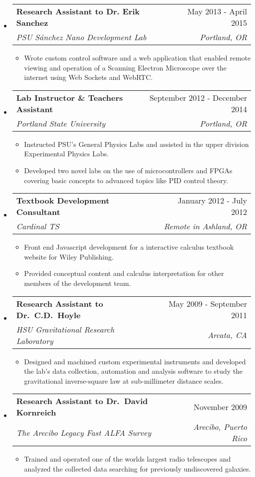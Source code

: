 \documentclass[letterpaper,11pt]{article}
\makeatletter
\newcommand{\resitem}[1]{\item #1 \vspace{-2pt}}
\newcommand{\ressubheading}[4]{
\begin{tabular*}{7.0in}{l@{\extracolsep{\fill}}r}
		\textbf{#1} & #2 \\
		\textit{#3} & \textit{#4} \\
\end{tabular*}\vspace{-6pt}}
\makeatother
\begin{document}
\begin{itemize}
\item
\ressubheading
{Research Assistant to Dr. Erik Sanchez}
{May 2013 - April 2015}
{PSU S\'anchez Nano Development Lab}
{Portland, OR}
\begin{itemize}
    \resitem
    {Wrote custom control software and a web application that enabled remote viewing and operation of a Scanning Electron Microscope over the internet using Web Sockets and WebRTC.}
\end{itemize}

\item
\ressubheading
{Lab Instructor \& Teachers Assistant}
{September 2012 - December 2014}
{Portland State University}
{Portland, OR}
\begin{itemize}
	\resitem
    {Instructed PSU's General Physics Labs and assisted in the upper division Experimental Physics Labs.}
	\resitem
    {Developed two novel labs on the use of microcontrollers and FPGAs covering basic concepts to advanced topics like PID control theory.}
\end{itemize}

\item
\ressubheading{Textbook Development Consultant}{January 2012 - July 2012}{Cardinal TS}{Remote in Ashland, OR}
\begin{itemize}
    \resitem
    {Front end Javascript development for a interactive calculus textbook website for Wiley Publishing.}
	\resitem
    {Provided conceptual content and calculus interpretation for other members of the development team.}
\end{itemize}

\item
\ressubheading
{Research Assistant to Dr.\ C\@.D.\ Hoyle}
{May 2009 - September 2011}
{HSU Gravitational Research Laboratory}
{Arcata, CA}
\begin{itemize}
    \resitem
    {Designed and machined custom experimental instruments and developed the lab's data collection, automation and analysis software to study the gravitational inverse-square law at sub-millimeter distance scales.}
\end{itemize}

\item
\ressubheading
{Research Assistant to Dr.\ David Kornreich}
{November 2009}
{The Arecibo Legacy Fast ALFA Survey}
{Arecibo, Puerto Rico}
\begin{itemize}
    \resitem
    {Trained and operated one of the worlds largest radio telescopes and analyzed the collected data searching for previously undiscovered galaxies.}
\end{itemize}


\end{itemize}
\end{document}
